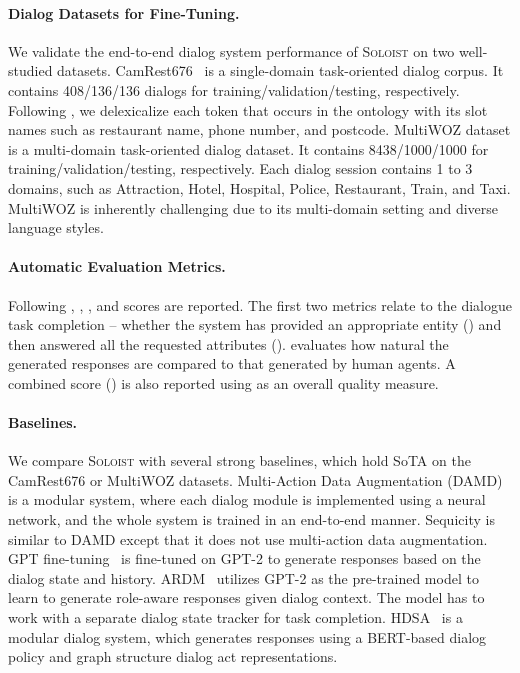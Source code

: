 \documentclass[11pt,a4paper]{article}
\newcommand{\model}{\textsc{Soloist}}
\begin{document}
\paragraph{Dialog Datasets for Fine-Tuning.} We validate the end-to-end dialog system performance of \model{} on two well-studied datasets.
 CamRest676~\cite{wen2016network} is a single-domain task-oriented dialog corpus. It contains 408/136/136 dialogs for training/validation/testing, respectively. Following \citet{lei2018sequicity}, we delexicalize each token that occurs in the ontology with its slot names such as restaurant name, phone number, and postcode. 
 MultiWOZ dataset \cite{budzianowski2018multiwoz} is a multi-domain task-oriented dialog dataset. It contains 8438/1000/1000 for training/validation/testing, respectively. Each dialog session contains 1 to 3 domains, such as Attraction, Hotel, Hospital, Police, Restaurant, Train, and Taxi. MultiWOZ is inherently challenging due to its multi-domain setting and diverse language styles. 

\paragraph{Automatic Evaluation Metrics.} 
Following \citet{budzianowski2018multiwoz}, , , and  scores are reported. 
The first two metrics relate to the dialogue task completion -- whether the system has provided an appropriate entity () and then answered all the requested attributes ().
 evaluates how natural the generated responses are compared to that generated by human agents.
A combined score () is also reported using  as an overall quality measure.

\paragraph{Baselines.} We compare \model{} with several strong baselines, which hold SoTA on the CamRest676 or MultiWOZ datasets.
  Multi-Action Data Augmentation (DAMD)~\cite{zhang2019task} is a modular system, where each dialog module is implemented using a neural network, and the whole system is trained in an end-to-end manner. 
 Sequicity \citep{lei2018sequicity} is similar to DAMD except that it does not use multi-action data augmentation.
 GPT fine-tuning~\citep{budzianowski2019hello} is fine-tuned on GPT-2 to generate responses based on the dialog state and history.
 ARDM~\citep{wu2019alternating} utilizes GPT-2 as the pre-trained model to learn to generate role-aware responses given dialog context. The model has to work with a separate dialog state tracker for task completion.
 HDSA~\cite{chen-etal-2019-semantically} is a modular dialog system, which generates responses using a BERT-based dialog policy and graph structure dialog act representations.
\end{document}
